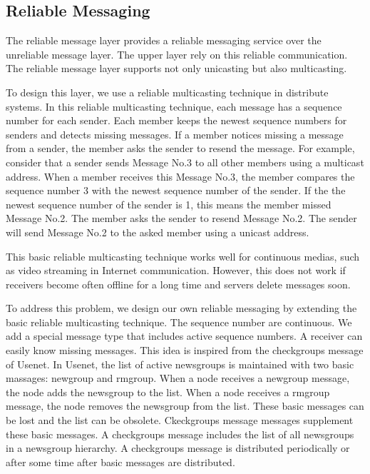 \documentclass[twocolumn,10pt]{article}
\begin{document}
\subsection{Reliable Messaging}

The reliable message layer provides a reliable messaging service over the unreliable message layer.
The upper layer rely on this reliable communication.
The reliable message layer supports not only unicasting but also multicasting.

To design this layer, we use a reliable multicasting technique in distribute systems\cite{tanenbaum2007distributed}.
In this reliable multicasting technique, each message has a sequence number for each sender.
Each member keeps the newest sequence numbers for senders and detects missing messages.
If a member notices missing a message from a sender, the member asks the sender to resend the message.
For example, consider that a sender sends Message No.3 to all other members using a multicast address.
When a member receives this Message No.3, the member compares the sequence number 3 with the newest sequence number of the sender.
If the the newest sequence number of the sender is 1, this means the member missed Message No.2.
The member asks the sender to resend Message No.2.
The sender will send Message No.2 to the asked member using a unicast address.

This basic reliable multicasting technique works well for continuous medias, such as video streaming in Internet communication.
However, this does not work if receivers become often offline for a long time and servers delete messages soon.

To address this problem, we design our own reliable messaging by extending the basic reliable multicasting technique.
The sequence number are continuous.
We add a special message type that includes active sequence numbers.
A receiver can easily know missing messages.
This idea is inspired from the checkgroups message of Usenet\cite{usenet}.
In Usenet, the list of active newsgroups is maintained with two basic massages: newgroup and rmgroup.
When a node receives a newgroup message, the node adds the newsgroup to the list.
When a node receives a rmgroup message, the node removes the newsgroup from the list.
These basic messages can be lost and the list can be obsolete.
Ckeckgroups message messages supplement these basic messages.
A checkgroups message includes the list of all newsgroups in a newsgroup hierarchy.
A checkgroups message is distributed periodically or after some time after basic messages are distributed.
\end{document}
